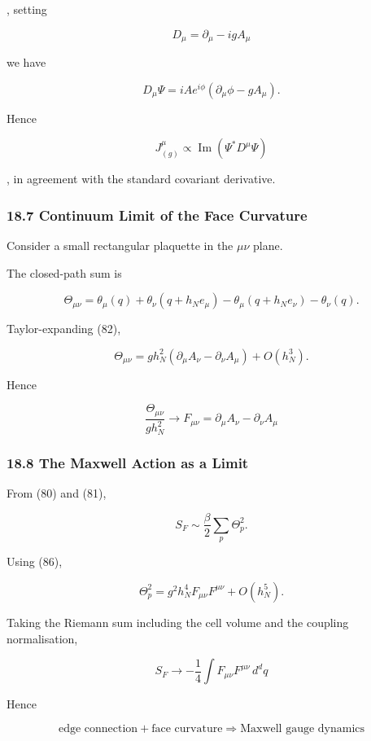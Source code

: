 \documentclass[
  a4paper,
]{article}
\begin{document}
, setting

\[
D_\mu
=
\partial_\mu
-
igA_\mu
\]

we have

\[
D_\mu\Psi
=
iAe^{i\phi}
\left(
\partial_\mu\phi-gA_\mu
\right).
\]

Hence

\[
\boxed{
J^\mu_{(g)}
\propto
\operatorname{Im}
\left(
\Psi^*D^\mu\Psi
\right)
}
\tag{84}
\]

, in agreement with the standard covariant derivative.

\subsubsection{18.7 Continuum Limit of the Face
Curvature}\label{continuum-limit-of-the-face-curvature}

Consider a small rectangular plaquette in the \(\mu\nu\) plane.

The closed-path sum is

\[
\Theta_{\mu\nu}
=
\theta_\mu(q)
+
\theta_\nu(q+h_Ne_\mu)
-
\theta_\mu(q+h_Ne_\nu)
-
\theta_\nu(q).
\tag{85}
\]

Taylor-expanding (82),

\[
\Theta_{\mu\nu}
=
gh_N^2
\left(
\partial_\mu A_\nu
-
\partial_\nu A_\mu
\right)
+
O(h_N^3).
\]

Hence

\[
\boxed{
\frac{\Theta_{\mu\nu}}{gh_N^2}
\longrightarrow
F_{\mu\nu}
=
\partial_\mu A_\nu
-
\partial_\nu A_\mu
}
\tag{86}
\]

\subsubsection{18.8 The Maxwell Action as a
Limit}\label{the-maxwell-action-as-a-limit}

From (80) and (81),

\[
S_F
\sim
\frac{\beta}{2}
\sum_p
\Theta_p^2.
\]

Using (86),

\[
\Theta_p^2
=
g^2h_N^4
F_{\mu\nu}F^{\mu\nu}
+
O(h_N^5).
\]

Taking the Riemann sum including the cell volume and the coupling
normalisation,

\[
\boxed{
S_F
\longrightarrow
-\frac14
\int
F_{\mu\nu}F^{\mu\nu}
\,d^dq
}
\tag{87}
\]

Hence

\[
\boxed{
\text{edge connection}
+
\text{face curvature}
\Longrightarrow
\text{Maxwell gauge dynamics}
}
\tag{88}
\]
\end{document}
